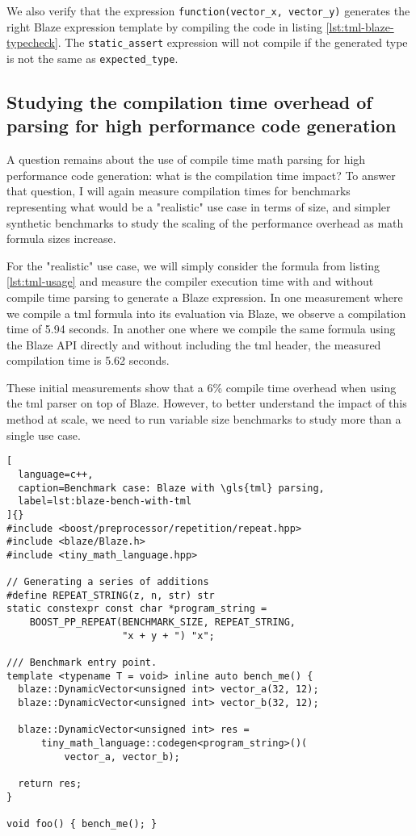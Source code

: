 \documentclass[../main]{subfiles}
\begin{document}
We also verify that the expression \lstinline{function(vector_x, vector_y)}
generates the right Blaze expression template by compiling the code in
listing \ref{lst:tml-blaze-typecheck}. The \lstinline{static_assert}
expression will not compile if the generated type is not the same as
\lstinline{expected_type}.

\subsection{
  Studying the compilation time overhead of parsing
  for high performance code generation
}

A question remains about the use of compile time math parsing
for high performance code generation: what is the compilation time impact?
To answer that question, I will again measure compilation times for benchmarks
representing what would be a "realistic" use case in terms of size,
and simpler synthetic benchmarks to study the scaling of the
performance overhead as math formula sizes increase.


For the "realistic" use case, we will simply consider the formula from
listing \ref{lst:tml-usage} and measure the compiler execution time
with and without compile time parsing to generate a Blaze expression.
In one measurement where we compile a \gls{tml} formula into its evaluation
via Blaze, we observe a compilation time of 5.94 seconds.
In another one where we compile the same formula using the Blaze API directly
and without including the \gls{tml} header, the measured compilation time is
5.62 seconds.

These initial measurements show that a 6\% compile time overhead when using
the \gls{tml} parser on top of Blaze.
However, to better understand the impact of this method at scale,
we need to run variable size benchmarks to study more than a single use case.

\begin{lstlisting}[
  language=c++,
  caption=Benchmark case: Blaze with \gls{tml} parsing,
  label=lst:blaze-bench-with-tml
]{}
#include <boost/preprocessor/repetition/repeat.hpp>
#include <blaze/Blaze.h>
#include <tiny_math_language.hpp>

// Generating a series of additions
#define REPEAT_STRING(z, n, str) str
static constexpr const char *program_string =
    BOOST_PP_REPEAT(BENCHMARK_SIZE, REPEAT_STRING,
                    "x + y + ") "x";

/// Benchmark entry point.
template <typename T = void> inline auto bench_me() {
  blaze::DynamicVector<unsigned int> vector_a(32, 12);
  blaze::DynamicVector<unsigned int> vector_b(32, 12);

  blaze::DynamicVector<unsigned int> res =
      tiny_math_language::codegen<program_string>()(
          vector_a, vector_b);

  return res;
}

void foo() { bench_me(); }
\end{lstlisting}
\end{document}
